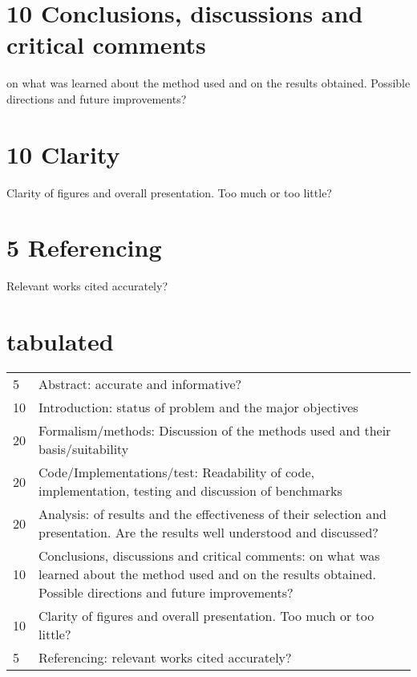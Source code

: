 \documentclass{article}
\begin{document}
	\section*{10 Conclusions, discussions and critical comments}
	on what was learned about the method used and on the results obtained. Possible directions and future improvements?
	\section*{10 Clarity}
	Clarity of figures and overall presentation. Too much or too little?
	\section*{5 Referencing}
	Relevant works cited accurately?
	
	\newpage
	\section*{tabulated}
	\begin{tabular}{l l}
		5	&	Abstract: accurate and informative?\\
		10	&	Introduction: status of problem and the major objectives\\
		20	&	Formalism/methods: Discussion of the methods used and their basis/suitability\\
		20	&	Code/Implementations/test: Readability of code, implementation, testing and discussion of benchmarks\\
		20	&	Analysis: of results and the effectiveness of their selection and presentation. Are the results well understood and discussed?\\
		10	&	Conclusions, discussions and critical comments: on what was learned about the method used and on the results obtained. Possible directions and future improvements?\\
		10	&	Clarity of figures and overall presentation. Too much or too little?\\
		5	&	Referencing: relevant works cited accurately?
	\end{tabular}
\end{document}
